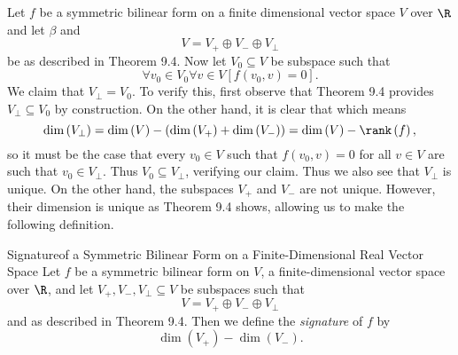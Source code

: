\documentclass[linearalgebra]{subfiles}
\begin{document}
    \begin{remark}
        Let $f$ be a symmetric bilinear form on a finite dimensional vector space $V$ over $\R$ and let $\beta$ and 
        \begin{equation*}
            V = V_+\oplus V_-\oplus V_\perp
        \end{equation*}
        be as described in Theorem 9.4. Now let $V_0\subseteq V$ be subspace such that
        \begin{equation*}
            \forall v_0\in V_0\forall v\in V \left[ f\left( v_0,v \right) = 0 \right] .
        \end{equation*}
        We claim that $V_\perp = V_0$. To verify this, first observe that Theorem 9.4 provides $V_\perp\subseteq V_0$ by construction. On the other hand, it is clear that
        which means
        \begin{equation*}
            \dim\left( V_\perp \right) = \dim\left( V \right) - \left( \dim\left( V_+ \right) + \dim\left( V_- \right)  \right) = \dim\left( V \right) -\rank\left( f \right) ,
        \end{equation*}
        so it must be the case that every $v_0\in V$ such that $f\left( v_0,v \right) = 0$ for all $v\in V$ are such that $v_0\in V_\perp$. Thus $V_0\subseteq V_\perp$, verifying our claim. Thus we also see that $V_\perp$ is unique. On the other hand, the subspaces $V_+$ and $V_-$ are not unique. However, their dimension is unique as Theorem 9.4 shows, allowing us to make the following definition.
    \end{remark}

    \begin{definition}{Signature}{of a Symmetric Bilinear Form on a Finite-Dimensional Real Vector Space}
        Let $f$ be a symmetric bilinear form on $V$, a finite-dimensional vector space over $\R$, and let $V_+, V_-, V_\perp\subseteq V$ be subspaces such that
        \begin{equation*}
            V = V_+\oplus V_-\oplus V_\perp
        \end{equation*}
        and as described in Theorem 9.4. Then we define the \emph{signature} of $f$ by
        \begin{equation*}
            \dim\left( V_+ \right) - \dim\left( V_- \right).
        \end{equation*}
    \end{definition}
\end{document}

